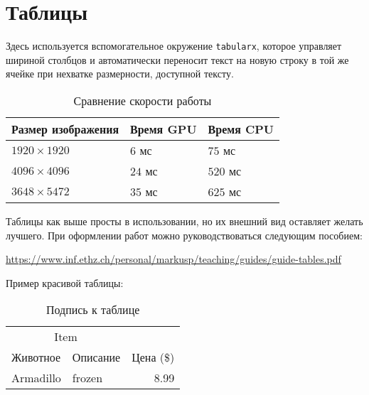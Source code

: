 
\section{Таблицы}
Здесь используется вспомогательное окружение \texttt{tabularx}, которое управляет шириной столбцов и автоматически переносит текст на новую строку в той же ячейке при нехватке размерности, доступной тексту.

\begin{table}[H]
    \centering
    \begin{tabularx}{\textwidth}{| X | X | X |}
    	\hline
    	\textbf{Размер изображения} & \textbf{Время GPU} & \textbf{Время CPU} \\ \hline
    	$1920\times 1920$           & $6$ мс             & $75$ мс            \\ \hline
    	$4096\times 4096$           & $24$ мс            & $520$ мс           \\ \hline
    	$3648\times 5472$           & $35$ мс            & $625$ мс           \\ \hline
    \end{tabularx}
    \caption{Сравнение скорости работы}
\end{table}

Таблицы как выше просты в использовании, но их внешний вид оставляет желать лучшего. При оформлении работ можно руководствоваться следующим пособием:
\begin{center}
    \href{https://www.inf.ethz.ch/personal/markusp/teaching/guides/guide-tables.pdf}{https://www.inf.ethz.ch/personal/markusp/teaching/guides/guide-tables.pdf}
\end{center}

Пример красивой таблицы:
\begin{table}[H]
    \centering
    \caption{Подпись к таблице}
    \begin{tabular}{llr}
    	\toprule
    	          \multicolumn{2}{c}{Item}            &           \\
    	\cmidrule(r){1-2}
        Животное & Описание & Цена (\$) \\ \midrule
    	Armadillo                          & frozen   &      8.99 \\ \bottomrule
    \end{tabular}
\end{table}
